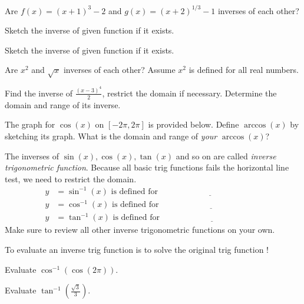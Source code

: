 \documentclass[../main.tex]{subfiles}
\begin{document}
\begin{example}
  Are \(f(x) = (x+1)^{3} - 2\) and \(g(x) = (x+2)^{1/3} - 1\) inverses of each other?
\end{example}

\begin{example}
  Sketch the inverse of given function if it exists.

  
  \quad
  
\end{example}

\begin{example}
  Sketch the inverse of given function if it exists.

  
  \quad
  
\end{example}
\clearpage
\begin{example}
  Are \(x^{2}\) and \(\sqrt{x}\) inverses of each other? Assume \(x^{2}\) is defined for all real numbers.
\end{example}

\begin{example}
  Find the inverse of \(\frac{(x - 3)^{4}}{2}\), restrict the domain if necessary.  Determine the domain and range of its inverse. 

\end{example}

\begin{example}
  The graph for \(\cos(x)\) on \([-2\pi, 2\pi]\) is provided below. Define \(\arccos(x)\) by sketching its graph. What is the domain and range of \emph{your} \(\arccos(x)\)?

  
\end{example}
\clearpage

The inverses of \(\sin(x), \cos(x), \tan(x)\) and so on are called \emph{inverse trigonometric function}. Because all basic trig functions fails the horizontal line test, we need to restrict the domain.
\medskip
\begin{align*}
  y &= \sin^{-1}(x) \text{ is defined for } \underline{\hspace{2in}} \\[3ex]
  y &= \cos^{-1}(x) \text{ is defined for } \underline{\hspace{2in}} \\[3ex]
  y &= \tan^{-1}(x) \text{ is defined for } \underline{\hspace{2in}}
\end{align*}
Make sure to review all other inverse trigonometric functions on your own.
\bigskip

To evaluate an inverse trig function is to solve the original trig function !

\begin{example}
  Evaluate \(\cos^{-1}(\cos(2\pi))\). 
\end{example}

\begin{example}
  Evaluate \(\tan^{-1}\left(\frac{\sqrt{3}}{3}\right)\).
\end{example}
\end{document}

